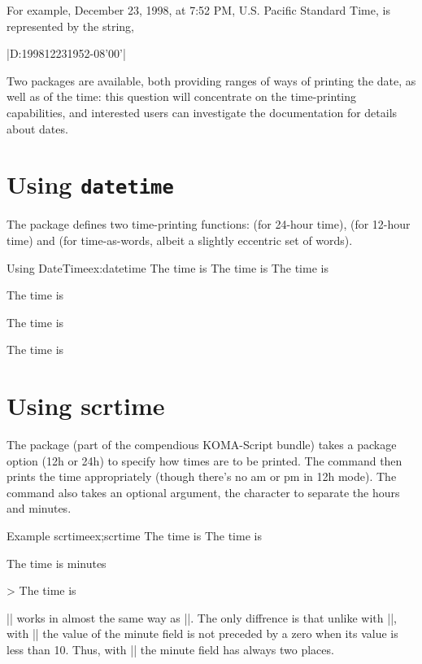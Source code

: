 For example, December 23, 1998, at 7:52 PM, U.S. Pacific Standard Time, is represented by the string,


|D:199812231952-08'00'|


Two packages are available, both providing ranges of ways of printing the date, as well as of the time: this question will concentrate on the time-printing capabilities, and interested users can investigate the documentation for details about dates.


\section*{Using \protect\texttt{datetime}}

The  package defines two time-printing functions: \cmd{\xxivtime} (for 24-hour time), \cmd{\ampmtime} (for 12-hour time) and \cmd{\oclock} (for time-as-words, albeit a slightly eccentric set of words).


\begin{texexample}{Using DateTime}{ex:datetime}
The time is \xxivtime
The time is \ampmtime
The time is \oclock

The time is \xxivtime

The time is \ampmtime

The time is \oclock
\end{texexample}


\section{Using scrtime}

The  package (part of the compendious KOMA-Script bundle) takes a package option (12h or 24h) to specify how times are to be printed. The command \cmd{\thistime} then prints the time appropriately (though there's no am or pm in 12h mode). The \cmd{\thistime} command also takes an optional argument, the character to separate the hours and minutes.


\begin{texexample}{Example scrtime}{ex;scrtime}
The time is \thistime
The time is \thistime[h]
\end{texexample}

\label{datesend}


The time is \thistime[ hours ] minutes 

{> The time is \thistime*[:] } 

|\thistime*| works in almost the same way as |\thistime|. The only
diffrence is that unlike with |\thistime|, with |\thistime*| the value of
the minute field is not preceded by a zero when its value is less than 10.
Thus, with |\thistime| the minute field has always two places.

